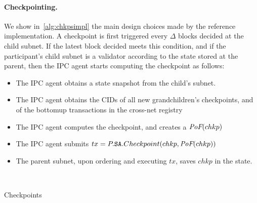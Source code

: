 \paragraph{Checkpointing.}
 We show in~\cref{alg:chkpsimpl} the main design choices made by the reference implementation. A checkpoint is first triggered every $\Delta$ blocks decided at the child subnet. If the latest block decided meets this condition, and if the participant's child subnet is a validator according to the state stored at the parent, then the IPC agent starts computing the checkpoint as follows:
\begin{itemize}
    \item The IPC agent obtains a state snapshot from the child's subnet.
    \item The IPC agent obtains the CIDs of all new grandchildren's checkpoints, and of the bottomup transactions in the cross-net registry
    \item The IPC agent computes the checkpoint, and creates a $\textit{PoF}(chkp)$
    \item The IPC agent submits $tx=P.\texttt{SA}.Checkpoint(chkp, \textit{PoF}(chkp))$
    \item The parent subnet, upon ordering and executing $tx$, saves $chkp$ in the state.  
\end{itemize}
\\
\begin{algorithm}[H]
\footnotesize
\caption{Checkpoints \impl {}}\label{alg:chkpsimpl}
  \DontPrintSemicolon
  
\end{algorithm}
